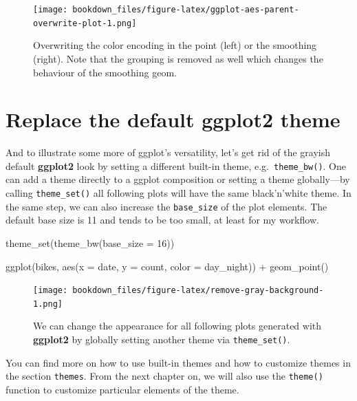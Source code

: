 \documentclass[
]{krantz}
\makeatletter
\newenvironment{Shaded}{\begin{snugshade}}{\end{snugshade}}
\newcommand{\AttributeTok}[1]{\textcolor[rgb]{0.61,0.61,0.61}{#1}}
\newcommand{\DecValTok}[1]{\textcolor[rgb]{0.06,0.06,0.06}{#1}}
\newcommand{\FunctionTok}[1]{\textcolor[rgb]{0,0,0}{#1}}
\newcommand{\NormalTok}[1]{#1}
\newcommand{\SpecialCharTok}[1]{\textcolor[rgb]{0,0,0}{#1}}
\newenvironment{kframe}{%
\medskip{}
\setlength{\fboxsep}{.8em}
 \def\at@end@of@kframe{}%
 \ifinner\ifhmode%
  \def\at@end@of@kframe{\end{minipage}}%
  \begin{minipage}{\columnwidth}%
 \fi\fi%
 \def\FrameCommand##1{\hskip\@totalleftmargin \hskip-\fboxsep
 \colorbox{shadecolor}{##1}\hskip-\fboxsep
     \hskip-\linewidth \hskip-\@totalleftmargin \hskip\columnwidth}%
 \MakeFramed {\advance\hsize-\width
   \@totalleftmargin\z@ \linewidth\hsize
   \@setminipage}}%
 {\par\unskip\endMakeFramed%
 \at@end@of@kframe}
\renewenvironment{Shaded}{\begin{kframe}}{\end{kframe}}
\makeatother
\begin{document}
\begin{figure}
\centering
\texttt{[image: bookdown\_files/figure-latex/ggplot-aes-parent-overwrite-plot-1.png]}
\caption{\label{fig:ggplot-aes-parent-overwrite-plot}Overwriting the color encoding in the point (left) or the smoothing (right). Note that the grouping is removed as well which changes the behaviour of the smoothing geom.}
\end{figure}

\hypertarget{theme}{%
\section{\texorpdfstring{Replace the default \textbf{ggplot2} theme}{Replace the default ggplot2 theme}}\label{theme}}

And to illustrate some more of ggplot's versatility, let's get rid of the grayish default \textbf{ggplot2} look by setting a different built-in theme, e.g.~\texttt{theme\_bw()}. One can add a theme directly to a ggplot composition or setting a theme globally---by calling \texttt{theme\_set()} all following plots will have the same black'n'white theme. In the same step, we can also increase the \texttt{base\_size} of the plot elements. The default base size is 11 and tends to be too small, at least for my workflow.

\begin{Shaded}
\begin{Highlighting}[]
\FunctionTok{theme\_set}\NormalTok{(}\FunctionTok{theme\_bw}\NormalTok{(}\AttributeTok{base\_size =} \DecValTok{16}\NormalTok{))}

\FunctionTok{ggplot}\NormalTok{(bikes, }\FunctionTok{aes}\NormalTok{(}\AttributeTok{x =}\NormalTok{ date, }\AttributeTok{y =}\NormalTok{ count, }\AttributeTok{color =}\NormalTok{ day\_night)) }\SpecialCharTok{+} 
  \FunctionTok{geom\_point}\NormalTok{()}
\end{Highlighting}
\end{Shaded}

\begin{figure}
\centering
\texttt{[image: bookdown\_files/figure-latex/remove-gray-background-1.png]}
\caption{\label{fig:remove-gray-background}We can change the appearance for all following plots generated with \textbf{ggplot2} by globally setting another theme via \texttt{theme\_set()}.}
\end{figure}

You can find more on how to use built-in themes and how to customize themes in the section \texttt{themes}. From the next chapter on, we will also use the \texttt{theme()} function to customize particular elements of the theme.
\end{document}
